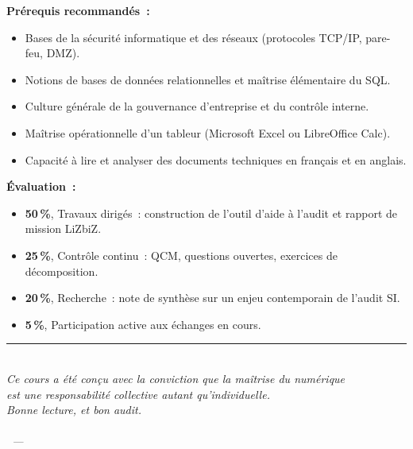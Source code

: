 \begin{boxinfo}
\textbf{Prérequis recommandés~:}
\begin{itemize}
    \item Bases de la sécurité informatique et des réseaux (protocoles TCP/IP, pare-feu, DMZ).
    \item Notions de bases de données relationnelles et maîtrise élémentaire du SQL. 
    \item Culture générale de la gouvernance d'entreprise et du contrôle interne.
    \item Maîtrise opérationnelle d'un tableur (Microsoft Excel ou LibreOffice Calc).
    \item Capacité à lire et analyser des documents techniques en français et en anglais.
\end{itemize}
\end{boxinfo}

\begin{boxinfo}
\textbf{Évaluation~:}
\begin{itemize}
    \item \textbf{50\,\%}, Travaux dirigés~: construction de l'outil d'aide à l'audit et rapport de mission LiZbiZ.
    \item \textbf{25\,\%}, Contrôle continu~: QCM, questions ouvertes, exercices de décomposition.
    \item \textbf{20\,\%}, Recherche~: note de synthèse sur un enjeu contemporain de l'audit SI.
    \item \textbf{5\,\%}, Participation active aux échanges en cours.
\end{itemize}
\end{boxinfo}

\vspace{2ex}
\begin{center}
    {\color{CouleurAccent}\rule{0.6\linewidth}{1pt}}\\[0.8ex]
    {\small\itshape\color{CouleurPrimaire}
        Ce cours a été conçu avec la conviction que la maîtrise du numérique\\
        est une responsabilité collective autant qu'individuelle.\\
        Bonne lecture, et bon audit.}\\[0.5ex]
    {\small\bfseries\color{CouleurPrimaire}\auteurcours}\\
    {\small\color{CouleurBordInfo}\itshape\institutionprimaire\ —\ \anneescolaire}
\end{center}
